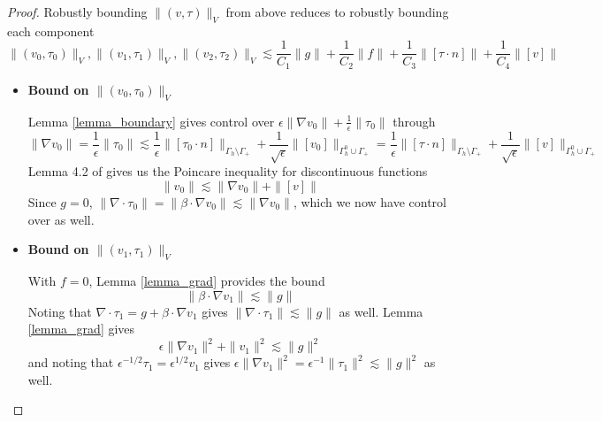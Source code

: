 \documentclass[11pt,onecolumn]{scrartcl}
\newcommand{\grad}{\nabla}
\renewcommand{\div}{\grad \cdot}
\begin{document}
\begin{proof}
Robustly bounding $\|\left(v,\tau\right)\|_V$ from above reduces to robustly bounding each component 
\[
\|\left(v_{0},\tau_{0}\right)\|_V, \|\left(v_{1},\tau_{1}\right)\|_V, \|\left(v_{2},\tau_{2}\right)\|_V \lesssim \frac{1}{C_1}\|g\| + \frac{1}{C_2}\|f\| + \frac{1}{C_3}\|[\tau\cdot n]\| + \frac{1}{C_4}\|[v]\|
\]
\begin{itemize}
\item \textbf{Bound on $\|\left(v_{0},\tau_{0}\right)\|_V$}
 
Lemma \ref{lemma_boundary} gives control over $\epsilon\|\grad v_0\| + \frac{1}{\epsilon}\|\tau_0\|$ through
\[
\|\grad v_0\| = \frac{1}{\epsilon}\|\tau_0\| \lesssim \frac{1}{\epsilon} \| [\tau_0\cdot n]\|_{\Gamma_h \setminus \Gamma_+} + \frac{1}{\sqrt{\epsilon}} \| [v_0]\|_{\Gamma_h^0 \cup \Gamma_+} = \frac{1}{\epsilon} \| [\tau\cdot n]\|_{\Gamma_h \setminus \Gamma_+} + \frac{1}{\sqrt{\epsilon}} \| [v]\|_{\Gamma_h^0 \cup \Gamma_+}
\]
Lemma 4.2 of \cite{analysisDPG} gives us the Poincare inequality for discontinuous functions
\[
\|v_0\| \lesssim \|\grad v_0\| + \|[v]\|
\]
Since $g = 0$, $\| \div \tau_0\| = \|\beta\cdot \grad v_0\|\lesssim \|\grad v_0\|$, which we now have control over as well.  

\item \textbf{Bound on $\|\left(v_{1},\tau_{1}\right)\|_V$}

With $f = 0$, Lemma \ref{lemma_grad} provides the bound
\[
\|\beta \cdot \grad v_1 \| \lesssim \| g\|
\]
Noting that $\div \tau_1 = g+\beta\cdot \grad v_1$ gives $\|\div \tau_1 \| \lesssim \|g\|$ as well.  Lemma \ref{lemma_grad} gives
\[
\epsilon \|\grad v_1\|^2 + \|v_1\|^2 \lesssim \|g\|^2
\]
and noting that $\epsilon^{-1/2}\tau_1 = \epsilon^{1/2}v_1$ gives $\epsilon\|\grad v_1\|^2 = \epsilon^{-1}\|\tau_1\|^2 \lesssim \|g\|^2$ as well.


\end{itemize}
\end{proof}
\end{document}
